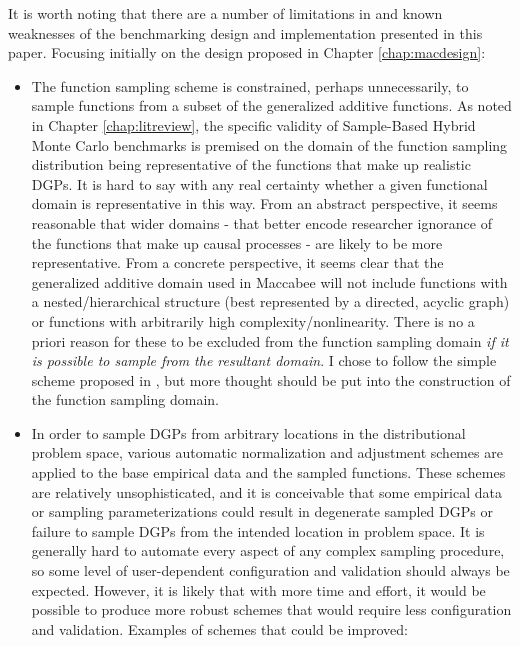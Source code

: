 \documentclass[../main.tex]{subfiles}
\begin{document}

It is worth noting that there are a number of limitations in and known weaknesses of the benchmarking design and implementation presented in this paper. Focusing initially on the design proposed in Chapter \ref{chap:macdesign}:

\begin{itemize}
    \item The function sampling scheme is constrained, perhaps unnecessarily, to sample functions from a subset of the generalized additive functions. As noted in Chapter \ref{chap:litreview}, the specific validity of Sample-Based Hybrid Monte Carlo benchmarks is premised on the domain of the function sampling distribution being representative of the functions that make up realistic DGPs. It is hard to say with any real certainty whether a given functional domain is representative in this way. From an abstract perspective, it seems reasonable that wider domains - that better encode researcher ignorance of the functions that make up causal processes - are likely to be more representative. From a concrete perspective, it seems clear that the generalized additive domain used in Maccabee will not include functions with a nested/hierarchical structure (best represented by a directed, acyclic graph) or functions with arbitrarily high complexity/nonlinearity. There is no a priori reason for these to be excluded from the function sampling domain \textit{if it is possible to sample from the resultant domain}. I chose to follow the simple scheme proposed in \textcite{Dorie2019Automated1}, but more thought should be put into the construction of the function sampling domain.
    
    \item In order to sample DGPs from arbitrary locations in the distributional problem space, various automatic normalization and adjustment schemes are applied to the base empirical data and the sampled functions. These schemes are relatively unsophisticated, and it is conceivable that some empirical data or sampling parameterizations could result in degenerate sampled DGPs or failure to sample DGPs from the intended location in problem space. It is generally hard to automate every aspect of any complex sampling procedure, so some level of user-dependent configuration and validation should always be expected. However, it is likely that with more time and effort, it would be possible to produce more robust schemes that would require less configuration and validation. Examples of schemes that could be improved:
    

\end{itemize}
\end{document}
